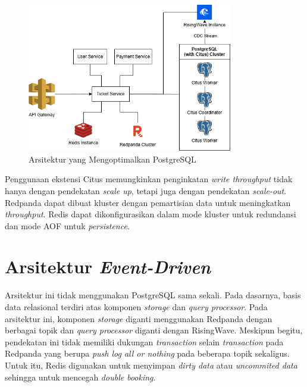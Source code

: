 \begin{figure}[ht]
    \centering
    \includegraphics[width=0.8\textwidth]{resources/chapter-3/architecture-optimized.png}
    \caption{Arsitektur yang Mengoptimalkan PostgreSQL}
    \label{fig:optimized-architecture}
\end{figure}

Penggunaan ekstensi Citus memungkinkan penginkatan \textit{write throughput} tidak hanya dengan pendekatan \textit{scale up}, tetapi juga dengan pendekatan \textit{scale-out}. Redpanda dapat dibuat kluster dengan pemartisian data untuk meningkatkan \textit{throughput}. Redis dapat dikonfigurasikan dalam mode kluster untuk redundansi dan mode AOF untuk \textit{persistence}.

\section{Arsitektur \textit{Event-Driven}}

Arsitektur ini tidak menggunakan PostgreSQL sama sekali. Pada dasarnya, basis data relasional terdiri atas komponen \textit{storage} dan \textit{query processor}. Pada arsitektur ini, komponen \textit{storage} diganti menggunakan Redpanda dengan berbagai topik dan \textit{query processor} diganti dengan RisingWave. Meskipun begitu, pendekatan ini tidak memiliki dukungan \textit{transaction} selain \textit{transaction} pada Redpanda yang berupa \textit{push log all or nothing} pada beberapa topik sekaligus. Untuk itu, Redis digunakan untuk menyimpan \textit{dirty data} atau \textit{uncommited data} sehingga untuk mencegah \textit{double booking}.


